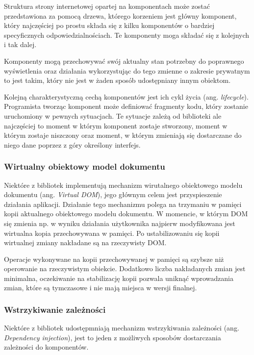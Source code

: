 \documentclass[polish, twoside, 12pt]{mwart}
\begin{document}
Struktura strony internetowej opartej na komponentach może zostać przedstawiona za pomocą drzewa, którego korzeniem jest główny komponent, który najczęściej po prostu składa się z kilku komponentów o bardziej specyficznych odpowiedzialnościach. Te komponenty moga składać się z kolejnych i tak dalej. 

Komponenty mogą przechowywać swój aktualny stan potrzebny do poprawnego wyświetlenia oraz działania wykorzystując do tego zmienne o zakresie prywatnym to jest takim, który nie jest w żaden sposób udostępniany innym obiektom.

Kolejną charakterystyczną cechą komponentów jest ich cykl życia (ang. \emph{lifecycle}). Programista tworząc komponent może definiować fragmenty kodu, który zostanie uruchomiony w pewnych sytuacjach. Te sytuacje zależą od biblioteki ale najczęściej to moment w którym komponent zostaje stworzony, moment w którym zostaje niszczony oraz moment, w którym zmieniają się dostarczane do niego dane poprzez z góry określony interfejs.

\subsubsection{Wirtualny obiektowy model dokumentu}

Niektóre z bibliotek implementują mechanizm wirutalnego obiektowego modelu dokumentu (ang. \emph{ Virtual DOM}), jego głównym celem jest przyspieszenie działania aplikacji. Działanie tego mechanizmu polega na trzymaniu w pamięci kopii aktualnego obiektowego modelu dokumentu. W momencie, w którym DOM się zmienia np. w wyniku działania użytkownika najpierw modyfikowana jest wirtualna kopia przechowywana w pamięci. Po ustabilizowaniu się kopii wirtualnej zmiany nakładane są na rzeczywisty DOM.

Operacje wykonywane na kopii przechowywanej w pamięci są szybsze niż operowanie na rzeczywistym obiekcie. Dodatkowo liczba nakładanych zmian jest minimalna, oczekiwanie na stabilizację kopii pozwala uniknąć wprowadzania zmian, które są tymczasowe i nie mają miejsca w wersji finalnej.

\subsubsection{Wstrzykiwanie zależności}

Niektóre z bibliotek udostępmniają mechanizm wstrzykiwania zależności (ang. \emph {Dependency injection}), jest to jeden z możliwych sposobów dostarczania zależności do komponentów.
\end{document}
